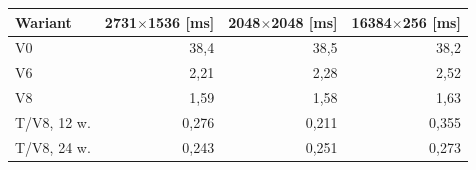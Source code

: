 \begin{tabular}{lrrr}
\toprule
Wariant & 2731$\times$1536 [ms] & 2048$\times$2048 [ms] & 16384$\times$256 [ms] \\
\midrule
V0 & 38,4 & 38,5 & 38,2 \\
V6 & 2,21 & 2,28 & 2,52 \\
V8 & 1,59 & 1,58 & 1,63 \\
T/V8, 12 w. & 0,276 & 0,211 & 0,355 \\
T/V8, 24 w. & 0,243 & 0,251 & 0,273 \\
\bottomrule
\end{tabular}
